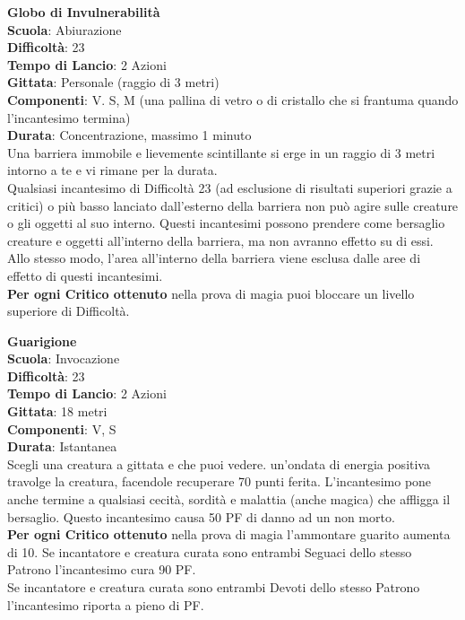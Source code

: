 \begin{multicols}{2}
\medskip\textbf{Globo di Invulnerabilità}\\
\textbf{Scuola}: Abiurazione\\
\textbf{Difficoltà}: 23\\
\textbf{Tempo di Lancio}: 2 Azioni\\
\textbf{Gittata}: Personale (raggio di 3 metri)\\
\textbf{Componenti}: V. S, M (una pallina di vetro o di cristallo che si frantuma quando l'incantesimo termina) \\
\textbf{Durata}: Concentrazione, massimo 1 minuto\\
Una barriera immobile e lievemente scintillante si erge in un raggio di 3 metri intorno a te e vi rimane per la durata.\\
Qualsiasi incantesimo di Difficoltà 23 (ad esclusione di risultati superiori grazie a critici) o più basso lanciato dall'esterno della barriera non può agire sulle creature o gli oggetti al suo interno. Questi incantesimi possono prendere come bersaglio creature e oggetti all'interno della barriera, ma non avranno effetto su di essi. Allo stesso modo, l'area all'interno della barriera viene esclusa dalle aree di effetto di questi incantesimi.\\
\textbf{Per ogni Critico ottenuto} nella prova di magia puoi bloccare un livello superiore di Difficoltà.

\medskip\textbf{Guarigione}\\
\textbf{Scuola}: Invocazione\\
\textbf{Difficoltà}: 23\\
\textbf{Tempo di Lancio}: 2 Azioni\\
\textbf{Gittata}: 18 metri\\
\textbf{Componenti}: V, S\\
\textbf{Durata}: Istantanea\\
Scegli una creatura a gittata e che puoi vedere. un'ondata di energia positiva travolge la creatura, facendole recuperare 70 punti ferita. L'incantesimo pone anche termine a qualsiasi cecità, sordità e malattia (anche magica) che affligga il bersaglio. Questo incantesimo causa 50 PF di danno ad un non morto.\\
\textbf{Per ogni Critico ottenuto} nella prova di magia l'ammontare guarito aumenta di 10.
Se incantatore e creatura curata sono entrambi Seguaci dello stesso Patrono l'incantesimo cura 90 PF.\\
Se incantatore e creatura curata sono entrambi Devoti dello stesso Patrono l'incantesimo riporta a pieno di PF.\\


\end{multicols}
